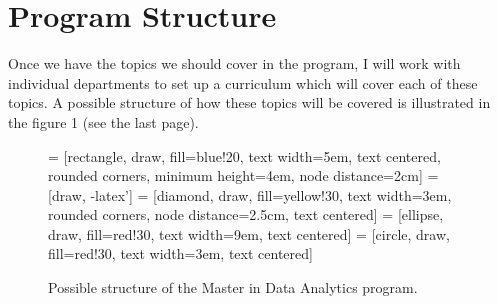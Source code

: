 \documentclass[12pt]{article}
\begin{document}
\section{Program Structure}

Once we have the topics we should cover in the program, I will work with individual departments to set up a curriculum which will cover each of these topics.  A possible structure of how these topics will be covered is illustrated in the figure 1 (see the last page). 

\begin{figure}[H]
  \centering
  \caption{Possible structure of the Master in Data Analytics program.}
  \label{fig:1}
\usetikzlibrary{shapes.geometric,arrows}
 = [rectangle, draw, fill=blue!20, 
    text width=5em, text centered, rounded corners, minimum height=4em, node distance=2cm]
 = [draw, -latex']
 = [diamond, draw, fill=yellow!30, text width=3em, rounded corners, node distance=2.5cm, text centered]
 = [ellipse, draw, fill=red!30, text width=9em, text centered]
 = [circle, draw, fill=red!30, text width=3em, text centered]

\begin{center}
\end{center}
\end{figure}
\end{document}
